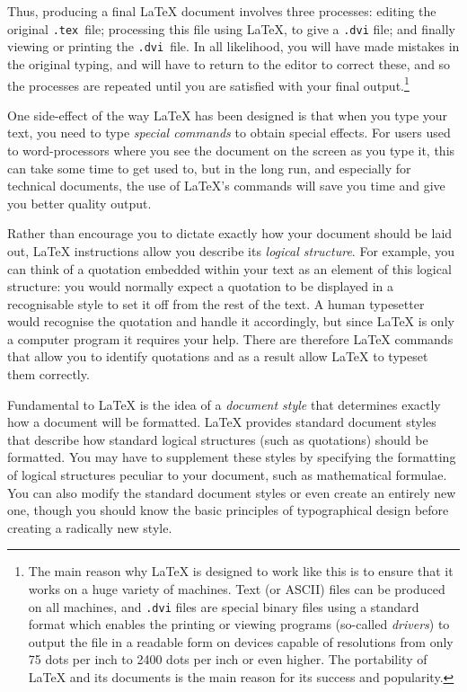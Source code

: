 \documentclass[10pt,a4paper]{article}
\newcommand{\fn}[1]{\hbox{\tt #1}}
\begin{document}
Thus, producing a final \LaTeX{} document involves three
processes: editing the original \fn{.tex}~file; processing this
file using \LaTeX, to give a \fn{.dvi} file; and finally viewing or
printing the \fn{.dvi}~file.  In all likelihood, you will have made
mistakes in the original typing, and will have to return to the
editor to correct these, and so the processes are repeated until
you are satisfied with your final output.\footnote{The 
main reason why \LaTeX{} is designed to work 
like this is to ensure that it works on a huge variety of machines.
Text (or ASCII) files can be produced on all machines, and \fn{.dvi}
files are special binary files using a standard format which enables
the printing or viewing programs (so-called \textit{drivers}) to
output the file in a readable form on devices capable of resolutions
from only 75 dots per inch to 2400 dots per inch or even higher.
The portability of \LaTeX{} and its documents is the main reason for its
success and popularity.}

One side-effect of the way \LaTeX{} has been designed is that
when you type your text, you need to type \textit{special commands}
to obtain special effects. For users used to
word-processors where you see the document on the screen as
you type it, this can take some time to get used to, but in the
long run, and especially for technical documents,
the use of \LaTeX's commands will save you time and give you 
better quality output.

Rather than encourage you to dictate exactly how your document
should be laid out, \LaTeX{} instructions allow you describe its
{\em logical structure\/}.  For example, you can think of a quotation
embedded within your text as an element of this logical structure: 
you would normally expect a quotation to be displayed in a recognisable 
style to set it off from the rest of the text.
A human typesetter would recognise the quotation and handle
it accordingly, but since \LaTeX{} is only a computer program it requires
your help.  There are therefore \LaTeX{} commands that allow you to
identify quotations and as a result allow \LaTeX{} to typeset them 
correctly.

Fundamental to \LaTeX{} is the idea of a {\em document style\/} that
determines exactly how a document will be formatted.  \LaTeX{} provides
standard document styles that describe how standard logical structures
(such as quotations) should be formatted.  You may have to supplement
these styles by specifying the formatting of logical structures
peculiar to your document, such as mathematical formulae.  You can
also modify the standard document styles or even create an entirely
new one, though you should know the basic principles of typographical
design before creating a radically new style.
\end{document}
